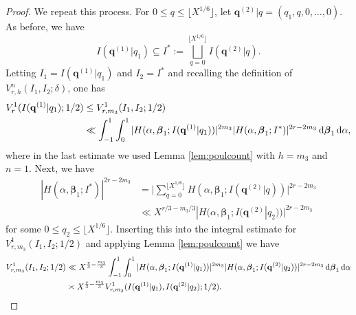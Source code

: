 \documentclass[11pt,reqno]{amsart}
\numberwithin{equation}{section}
\renewcommand{\d}{\,{\rm d}}
\begin{document}
\begin{proof}
We repeat this process. For $0 \leq q \leq \lfloor X^{1/6}\rfloor$, let $\mathbf{q}^{(2)}|q = (q_1,q,0,\ldots,0)$. As before, we have 
\[ I(\mathbf{q}^{(1)}|q_1) \subseteq I^* := \bigsqcup_{q=0}^{\lfloor X^{1/6}\rfloor} I(\mathbf{q}^{(2)}|q). \]
Letting $I_1 = I(\mathbf{q}^{(1)}|q_1)$ and $I_2 = I^*$ and recalling the definition of $ V_{r,h}^n(I_1, I_2; \delta)$, one has 
\begin{align*} V_{r}^1( I(\mathbf{q}^{(1)}|q_1);1/2) & \leq V_{r,m_3}^1(I_1, I_2; 1/2) 
\\ 
& \ll \int_{-1}^1 \int_0^1 | H(\alpha,\boldsymbol{\beta}_1;I(\mathbf{q}^{(1)}|q_1) )|^{2m_3} | H(\alpha,\boldsymbol{\beta}_1;I^* )|^{2r-2m_3}\d\boldsymbol{\beta}_1\d\alpha, 
\end{align*}
where in the last estimate we used Lemma \ref{lem:poulcount} with $h = m_3$ and $n = 1$. 
Next, we have 
\begin{align*} | H(\alpha,\boldsymbol{\beta}_1;I^* )|^{2r-2m_3} & = \Big|\sum_{q=0}^{\lfloor X^{1/6} \rfloor} H(\alpha,\boldsymbol{\beta}_1; I(\mathbf{q}^{(2)}|q)) \Big|^{2r-2m_3} 
\\ 
& \ll X^{r/3-m_3/3} |H(\alpha,\boldsymbol{\beta}_1; I(\mathbf{q}^{(2)}|q_2))|^{2r-2m_3} 
\end{align*}
for some $0 \leq q_2 \leq \lfloor X^{1/6} \rfloor$. Inserting this into the integral estimate for $V_{r,m_3}^1(I_1, I_2; 1/2)$ and applying Lemma \ref{lem:poulcount} we have 
\begin{align*}
V_{r,m_3}^1(I_1, I_2; 1/2) & \ll X^{\frac{r}{3}-\frac{m_3}{3}} \int_{-1}^1 \int_0^1 | H(\alpha,\boldsymbol{\beta}_1;I(\mathbf{q}^{(1)}|q_1) )|^{2m_3} |H(\alpha,\boldsymbol{\beta}_1; I(\mathbf{q}^{(2)}|q_2))|^{2r-2m_3}\d\boldsymbol{\beta}_1\d\alpha 
\\ 
& \asymp X^{\frac{r}{3}-\frac{m_3}{3}} V_{r,m_3}^1(I(\mathbf{q}^{(1)}|q_1), I(\mathbf{q}^{(2)}|q_2);1/2). 
\end{align*}


\end{proof}
\end{document}
